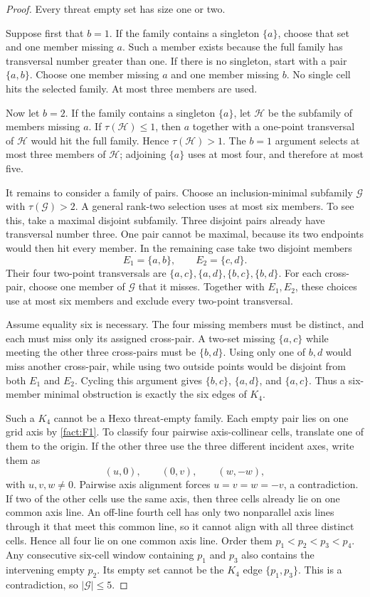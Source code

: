\begin{proof}
Every threat empty set has size one or two.

Suppose first that $b=1$.  If the family contains a singleton $\{a\}$, choose
that set and one member missing $a$.  Such a member exists because the full
family has transversal number greater than one.  If there is no singleton,
start with a pair $\{a,b\}$.  Choose one member missing $a$ and one member
missing $b$.  No single cell hits the selected family.  At most three members
are used.

Now let $b=2$.  If the family contains a singleton $\{a\}$, let
$\mathcal H$ be the subfamily of members missing $a$.  If
$\tau(\mathcal H)\le1$, then $a$ together with a one-point transversal of
$\mathcal H$ would hit the full family.  Hence $\tau(\mathcal H)>1$.  The
$b=1$ argument selects at most three members of $\mathcal H$; adjoining
$\{a\}$ uses at most four, and therefore at most five.

It remains to consider a family of pairs.  Choose an inclusion-minimal
subfamily $\mathcal G$ with $\tau(\mathcal G)>2$.  A general rank-two
selection uses at most six members.  To see this, take a maximal disjoint
subfamily.  Three disjoint pairs already have transversal number three.  One
pair cannot be maximal, because its two endpoints would then hit every
member.  In the remaining case take two disjoint members
\[
E_1=\{a,b\},\qquad E_2=\{c,d\}.
\]
Their four two-point transversals are
$\{a,c\},\{a,d\},\{b,c\},\{b,d\}$.  For each cross-pair, choose one member of
$\mathcal G$ that it misses.  Together with $E_1,E_2$, these choices use at
most six members and exclude every two-point transversal.

Assume equality six is necessary.  The four missing members must be distinct,
and each must miss only its assigned cross-pair.  A two-set missing
$\{a,c\}$ while meeting the other three cross-pairs must be $\{b,d\}$.
Using only one of $b,d$ would miss another cross-pair, while using two outside
points would be disjoint from both $E_1$ and $E_2$.  Cycling this argument
gives $\{b,c\}$, $\{a,d\}$, and $\{a,c\}$.  Thus a six-member minimal
obstruction is exactly the six edges of $K_4$.

Such a $K_4$ cannot be a Hexo threat-empty family.  Each empty pair lies on
one grid axis by \cref{fact:F1}.  To classify four pairwise axis-collinear
cells, translate one of them to the origin.  If the other three use the three
different incident axes, write them as
\[
 (u,0),\qquad(0,v),\qquad(w,-w),
\]
with $u,v,w\ne0$.  Pairwise axis alignment forces
$u=v=w=-v$, a contradiction.  If two of the other cells use the same axis,
then three cells already lie on one common axis line.  An off-line fourth cell
has only two nonparallel axis lines through it that meet this common line, so
it cannot align with all three distinct cells.  Hence all four lie on one
common axis line.  Order them $p_1<p_2<p_3<p_4$.  Any consecutive six-cell
window containing $p_1$ and $p_3$ also contains the intervening empty $p_2$.
Its empty set cannot be the $K_4$ edge $\{p_1,p_3\}$.  This is a
contradiction, so $|\mathcal G|\le5$.


\end{proof}
